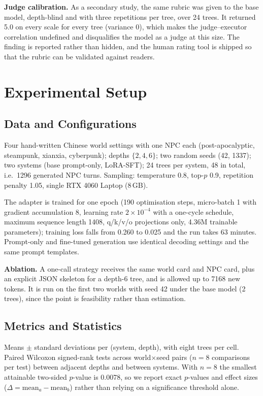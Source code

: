 \documentclass[conference]{IEEEtran}
\begin{document}
\textbf{Judge calibration.} As a secondary study, the same rubric was given to the base model,
depth-blind and with three repetitions per tree, over 24 trees. It returned 5.0 on every scale for
every tree (variance 0), which makes the judge--executor correlation undefined and disqualifies the
model as a judge at this size. The finding is reported rather than hidden, and the human rating tool
is shipped so that the rubric can be validated against readers.

\section{Experimental Setup}
\subsection{Data and Configurations}
Four hand-written Chinese world settings with one NPC each (post-apocalyptic, steampunk, xianxia,
cyberpunk); depths $\{2,4,6\}$; two random seeds (42, 1337); two systems (base prompt-only,
LoRA-SFT); 24 trees per system, 48 in total, i.e.\ 1296 generated NPC turns.
Sampling: temperature 0.8, top-$p$ 0.9, repetition penalty 1.05, single RTX 4060 Laptop (8\,GB).

The adapter is trained for one epoch (190 optimisation steps, micro-batch 1 with gradient
accumulation 8, learning rate $2\times10^{-4}$ with a one-cycle schedule, maximum sequence length
1408, q/k/v/o projections only, 4.36M trainable parameters); training loss falls from 0.260 to
0.025 and the run takes 63 minutes. Prompt-only and fine-tuned generation use identical decoding
settings and the same prompt templates.

\textbf{Ablation.} A one-call strategy receives the same world card and NPC card, plus an explicit
JSON skeleton for a depth-6 tree, and is allowed up to 7168 new tokens. It is run on the first two
worlds with seed 42 under the base model (2 trees), since the point is feasibility rather than
estimation.

\subsection{Metrics and Statistics}
Means $\pm$ standard deviations per (system, depth), with eight trees per cell. Paired Wilcoxon
signed-rank tests across world$\times$seed pairs ($n=8$ comparisons per test) between adjacent
depths and between systems. With $n=8$ the smallest attainable two-sided $p$-value is 0.0078, so
we report exact $p$-values and effect sizes ($\Delta=\text{mean}_a-\text{mean}_b$) rather than
relying on a significance threshold alone.
\end{document}

